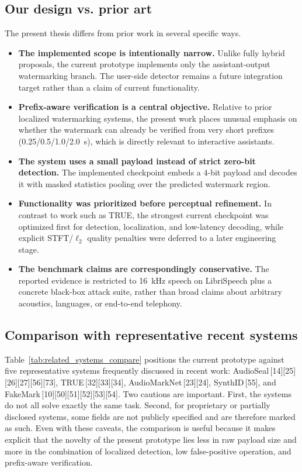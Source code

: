 \subsection{Our design vs. prior art}
The present thesis differs from prior work in several specific ways.
\begin{itemize}[leftmargin=1.25em]
  \item \textbf{The implemented scope is intentionally narrow.} Unlike fully hybrid proposals, the current prototype implements only the assistant-output watermarking branch. The user-side detector remains a future integration target rather than a claim of current functionality.
  \item \textbf{Prefix-aware verification is a central objective.} Relative to prior localized watermarking systems, the present work places unusual emphasis on whether the watermark can already be verified from very short prefixes (0.25/0.5/1.0/2.0~s), which is directly relevant to interactive assistants.
  \item \textbf{The system uses a small payload instead of strict zero-bit detection.} The implemented checkpoint embeds a 4-bit payload and decodes it with masked statistics pooling over the predicted watermark region.
  \item \textbf{Functionality was prioritized before perceptual refinement.} In contrast to work such as TRUE, the strongest current checkpoint was optimized first for detection, localization, and low-latency decoding, while explicit STFT/$\ell_2$ quality penalties were deferred to a later engineering stage.
  \item \textbf{The benchmark claims are correspondingly conservative.} The reported evidence is restricted to 16~kHz speech on LibriSpeech plus a concrete black-box attack suite, rather than broad claims about arbitrary acoustics, languages, or end-to-end telephony.
\end{itemize}

\subsection{Comparison with representative recent systems}
Table~\ref{tab:related_systems_compare} positions the current prototype against five representative systems frequently discussed in recent work: AudioSeal\,[14][25][26][27][56][73], TRUE\,[32][33][34], AudioMarkNet\,[23][24], SynthID\,[55], and FakeMark\,[10][50][51][52][53][54]. Two cautions are important. First, the systems do not all solve exactly the same task. Second, for proprietary or partially disclosed systems, some fields are not publicly specified and are therefore marked as such. Even with these caveats, the comparison is useful because it makes explicit that the novelty of the present prototype lies less in raw payload size and more in the combination of localized detection, low false-positive operation, and prefix-aware verification.

